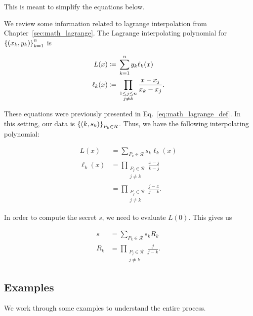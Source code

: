 \noindent
This is meant to simplify the equations below.

We review some information related to \gls{lagrange interpolation}
from Chapter~\ref{sec:math_lagrange}.
The Lagrange interpolating polynomial for
$\left\{ \left( x_{k},y_{k} \right) \right\}_{k=1}^{n}$ is

\begin{align}
    L(x) &\coloneqq{} \sum_{k=1}^{n} y_{k}\ell_{k}(x) \nonumber\\
    \ell_{k}(x) &\coloneqq{}
        \prod_{\substack{1\le j \le n \\ j\ne k}} \frac{x-x_{j}}{x_{k}-x_{j}}.
\end{align}

\noindent
These equations were previously presented in Eq.~\eqref{eq:math_lagrange_def}.
In this setting, our data is
$\left\{ \left( k, s_{k} \right) \right\}_{P_{k}\in\mathcal{R}}$.
Thus, we have the following interpolating polynomial:

\begin{align}
    L(x) &= \sum_{P_{k}\in\mathcal{R}} s_{k}\ell_{k}(x) \nonumber\\
    \ell_{k}(x) &=
        \prod_{\substack{P_{j}\in\mathcal{R} \\ j\ne k}}
            \frac{x-j}{k-j} \nonumber\\
    &= \prod_{\substack{P_{j}\in\mathcal{R} \\ j\ne k}}
            \frac{j-x}{j-k}.
\end{align}

\noindent
In order to compute the secret $s$, we need to evaluate $L(0)$.
This gives us

\begin{align}
    s &= \sum_{P_{k}\in\mathcal{R}} s_{k} R_{k} \nonumber\\
    R_{k} &= \prod_{\substack{P_{j}\in\mathcal{R} \\ j\ne k}}
        \frac{j}{j-k}.
\end{align}

\subsection{Examples}

We work through some examples to understand the entire process.


